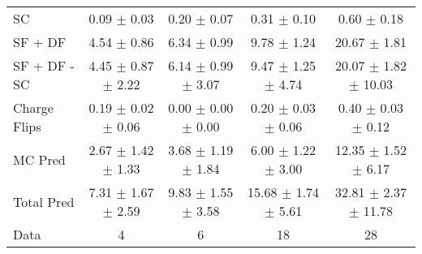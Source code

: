 \begin{tabular}{l|cccc}
                                 SC &  0.09 $\pm$  0.03 &  0.20 $\pm$  0.07 &  0.31 $\pm$  0.10 &  0.60 $\pm$  0.18 \\
                            SF + DF &  4.54 $\pm$  0.86 &  6.34 $\pm$  0.99 &  9.78 $\pm$  1.24 & 20.67 $\pm$  1.81 \\
\hline
                       SF + DF - SC &  4.45 $\pm$  0.87 $\pm$  2.22 &  6.14 $\pm$  0.99 $\pm$  3.07 &  9.47 $\pm$  1.25 $\pm$  4.74 & 20.07 $\pm$  1.82 $\pm$ 10.03 \\
\hline\hline
                       Charge Flips &  0.19 $\pm$  0.02 $\pm$  0.06 &  0.00 $\pm$  0.00 $\pm$  0.00 &  0.20 $\pm$  0.03 $\pm$  0.06 &  0.40 $\pm$  0.03 $\pm$  0.12 \\
\hline
                            MC Pred &  2.67 $\pm$  1.42 $\pm$  1.33 &  3.68 $\pm$  1.19 $\pm$  1.84 &  6.00 $\pm$  1.22 $\pm$  3.00 & 12.35 $\pm$  1.52 $\pm$  6.17 \\
\hline
                         Total Pred &  7.31 $\pm$  1.67 $\pm$  2.59 &  9.83 $\pm$  1.55 $\pm$  3.58 & 15.68 $\pm$  1.74 $\pm$  5.61 & 32.81 $\pm$  2.37 $\pm$ 11.78 \\
\hline\hline
                               Data &     4 &     6 &    18 &    28 \\
\hline\hline
\end{tabular}


